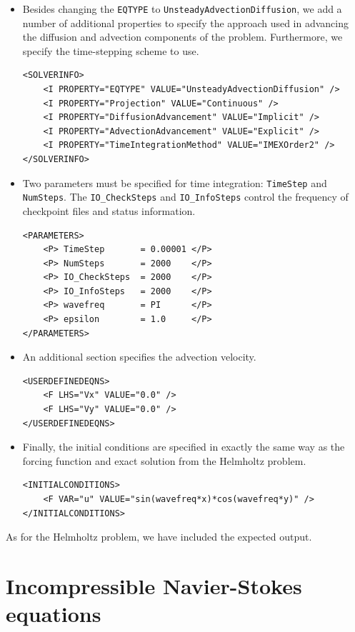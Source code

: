 \documentclass[a4paper,12pt]{article}
\begin{document}
\begin{itemize}
\item Besides changing the \texttt{EQTYPE} to
\texttt{UnsteadyAdvectionDiffusion}, we add a number of additional properties to
specify the approach used in advancing the diffusion and advection components of
the problem. Furthermore, we specify the time-stepping scheme to use.
\begin{verbatim}
<SOLVERINFO>
    <I PROPERTY="EQTYPE" VALUE="UnsteadyAdvectionDiffusion" />
    <I PROPERTY="Projection" VALUE="Continuous" />
    <I PROPERTY="DiffusionAdvancement" VALUE="Implicit" />
    <I PROPERTY="AdvectionAdvancement" VALUE="Explicit" />
    <I PROPERTY="TimeIntegrationMethod" VALUE="IMEXOrder2" />
</SOLVERINFO>
\end{verbatim}

\item Two parameters must be specified for time integration: \texttt{TimeStep}
and \texttt{NumSteps}. The \texttt{IO\_CheckSteps} and \texttt{IO\_InfoSteps}
control the frequency of checkpoint files and status information.
\begin{verbatim}
<PARAMETERS>
    <P> TimeStep       = 0.00001 </P>  
    <P> NumSteps       = 2000    </P>                
    <P> IO_CheckSteps  = 2000    </P>
    <P> IO_InfoSteps   = 2000    </P>
    <P> wavefreq       = PI      </P>                      
    <P> epsilon        = 1.0     </P>
</PARAMETERS>
\end{verbatim}

\item An additional section specifies the advection velocity.
\begin{verbatim}
<USERDEFINEDEQNS>
    <F LHS="Vx" VALUE="0.0" />
    <F LHS="Vy" VALUE="0.0" />
</USERDEFINEDEQNS>
\end{verbatim}

\item Finally, the initial conditions are specified in exactly the same way as
the forcing function and exact solution from the Helmholtz problem.
\begin{verbatim}
<INITIALCONDITIONS>
    <F VAR="u" VALUE="sin(wavefreq*x)*cos(wavefreq*y)" />
</INITIALCONDITIONS>
\end{verbatim}
\end{itemize}

As for the Helmholtz problem, we have included the expected output.


\clearpage
\section{Incompressible Navier-Stokes equations}
\end{document}
